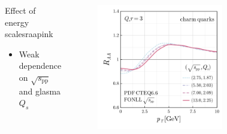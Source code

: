 \documentclass[aspectratio=169,11pt,usenames,dvipsnames]{beamer}
\begin{document}
\begin{frame}
\begin{center}
\begin{columns}[onlytextwidth,t]
\begin{figure}
            \end{figure}
            \begin{center}
                \begin{custombox2}{\normalsize Effect of energy scales}{raapink}
                    \small
                    \begin{varwidth}{0.97\textwidth}
                    \begin{itemize}\itemsep0em 
                        \itemsep0em
                        \footnotesize
                        \item Weak dependence on $\sqrt{s_\mathrm{pp}}$ and glasma $Q_s$
                    \end{itemize}
                    \end{varwidth}
                \end{custombox2}
            \end{center}
            \vspace{-10pt}
            \vspace{-7pt}
            \begin{figure}
                \centering
                \includegraphics[width=0.83\columnwidth]{images/clean_raa_tau_dep_charm_quark_Qs_fonll_energy_dep_qsenergymap_v3.png}
            \end{figure}
        \end{columns}    
    \end{center}
\end{frame}
\end{document}

